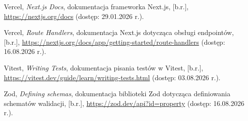\documentclass[12pt,a4paper]{article}
\begin{document}
\begin{list}{}{\setlength{\leftmargin}{0pt}\setlength{\itemindent}{0pt}\setlength{\labelwidth}{0pt}\setlength{\labelsep}{0pt}\setlength{\itemsep}{0.5\baselineskip}}
\item Vercel, \emph{Next.js Docs}, dokumentacja frameworka Next.js, [b.r.], \url{https://nextjs.org/docs} (dostęp: 29.01.2026 r.).

\item Vercel, \emph{Route Handlers}, dokumentacja Next.js dotycząca obsługi endpointów, [b.r.], \url{https://nextjs.org/docs/app/getting-started/route-handlers} (dostęp: 16.08.2026 r.).

\item Vitest, \emph{Writing Tests}, dokumentacja pisania testów w Vitest, [b.r.], \url{https://vitest.dev/guide/learn/writing-tests.html} (dostęp: 03.08.2026 r.).

\item Zod, \emph{Defining schemas}, dokumentacja biblioteki Zod dotycząca definiowania schematów walidacji, [b.r.], \url{https://zod.dev/api?id=property} (dostęp: 16.08.2026 r.).

\end{list}
\endgroup
\end{document}
